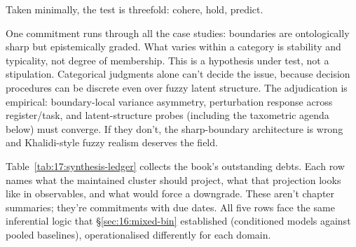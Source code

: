 Taken minimally, the test is threefold: cohere, hold, predict.

One commitment runs through all the case studies: boundaries are ontologically sharp but epistemically graded. What varies within a category is stability and typicality, not degree of membership. This is a hypothesis under test, not a stipulation. Categorical judgments alone can't decide the issue, because decision procedures can be discrete even over fuzzy latent structure. The adjudication is empirical: boundary-local variance asymmetry, perturbation response across register/task, and latent-structure probes (including the taxometric agenda below) must converge. If they don't, the sharp-boundary architecture is wrong and Khalidi-style fuzzy realism deserves the field.

Table~\ref{tab:17:synthesis-ledger} collects the book's outstanding debts. Each row names what the maintained cluster should project, what that projection looks like in observables, and what would force a downgrade. These aren't chapter summaries; they're commitments with due dates. All five rows face the same inferential logic that §\ref{sec:16:mixed-bin} established (conditioned models against pooled baselines), operationalised differently for each domain.

